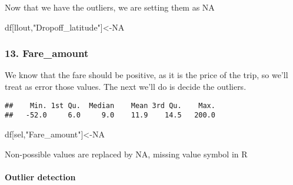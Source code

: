 \documentclass[
  18pt,
  a4paper]{article}
\newenvironment{Shaded}{\begin{snugshade}}{\end{snugshade}}
\newcommand{\CommentTok}[1]{\textcolor[rgb]{0.56,0.35,0.01}{\textit{#1}}}
\newcommand{\DecValTok}[1]{\textcolor[rgb]{0.00,0.00,0.81}{#1}}
\newcommand{\KeywordTok}[1]{\textcolor[rgb]{0.13,0.29,0.53}{\textbf{#1}}}
\newcommand{\NormalTok}[1]{#1}
\newcommand{\OperatorTok}[1]{\textcolor[rgb]{0.81,0.36,0.00}{\textbf{#1}}}
\newcommand{\OtherTok}[1]{\textcolor[rgb]{0.56,0.35,0.01}{#1}}
\newcommand{\StringTok}[1]{\textcolor[rgb]{0.31,0.60,0.02}{#1}}
\begin{document}
Now that we have the outliers, we are setting them as NA

\begin{Shaded}
\begin{Highlighting}[]
\NormalTok{df[llout,}\StringTok{"Dropoff_latitude"}\NormalTok{]<-}\OtherTok{NA}
\end{Highlighting}
\end{Shaded}

\hypertarget{fare_amount}{%
\subsubsection{13. Fare\_amount}\label{fare_amount}}

We know that the fare should be positive, as it is the price of the
trip, so we'll treat as error those values. The next we'll do is decide
the outliers.

\begin{Shaded}
\end{Shaded}

\begin{verbatim}
##    Min. 1st Qu.  Median    Mean 3rd Qu.    Max. 
##   -52.0     6.0     9.0    11.9    14.5   200.0
\end{verbatim}

\begin{Shaded}
\end{Shaded}

\begin{Shaded}
\begin{Highlighting}[]
\NormalTok{df[sel,}\StringTok{"Fare_amount"}\NormalTok{]<-}\OtherTok{NA}    
\end{Highlighting}
\end{Shaded}

Non-possible values are replaced by NA, missing value symbol in R

\hypertarget{outlier-detection-2}{%
\paragraph{Outlier detection}\label{outlier-detection-2}}
\end{document}
